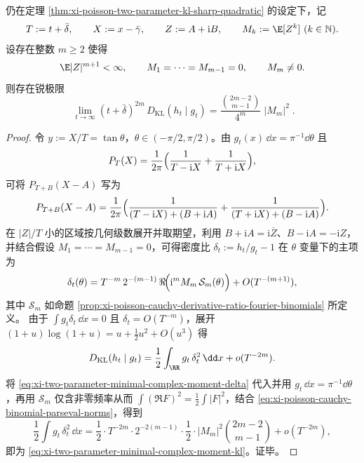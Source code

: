 \begin{theorem}[最小非零复矩支配的高阶相对熵谱指纹]\label{thm:xi-poisson-two-parameter-minimal-complex-moment-kl}
仍在定理 \ref{thm:xi-poisson-two-parameter-kl-sharp-quadratic} 的设定下，记
\[
T:=t+\bar\delta,\qquad X:=x-\bar\gamma,\qquad
Z:=A+\mathrm{i}B,\qquad M_k:=\E[Z^k]\ (k\in\mathbb N).
\]
设存在整数 \(m\ge 2\) 使得
\[
\E|Z|^{m+1}<\infty,
\qquad
M_1=\cdots=M_{m-1}=0,
\qquad
M_m\neq 0.
\]
则存在锐极限
\begin{equation}\label{eq:xi-two-parameter-minimal-complex-moment-kl}
\boxed{\;
\lim_{t\to\infty} (t+\bar\delta)^{2m}\,D_{\mathrm{KL}}(h_t\mid g_t)
=\frac{\binom{2m-2}{m-1}}{4^{m}}\;|M_m|^2\; }.
\end{equation}
\end{theorem}
\begin{proof}
令 \(y:=X/T=\tan\theta\)，\(\theta\in(-\pi/2,\pi/2)\)。由
\(
g_t(x)\,\dd x=\pi^{-1}\dd\theta
\)
且
\[
P_T(X)=\frac{1}{2\pi}\Bigl(\frac{1}{T-\mathrm{i}X}+\frac{1}{T+\mathrm{i}X}\Bigr),
\]
可将
\(
P_{T+B}(X-A)
\)
写为
\[
P_{T+B}(X-A)
=\frac{1}{2\pi}\Bigl(\frac{1}{(T-\mathrm{i}X)+(B+\mathrm{i}A)}+\frac{1}{(T+\mathrm{i}X)+(B-\mathrm{i}A)}\Bigr).
\]
在 \(|Z|/T\) 小的区域按几何级数展开并取期望，利用 \(B+\mathrm{i}A=\mathrm{i}\overline{Z}\)、\(B-\mathrm{i}A=-\mathrm{i}Z\)，并结合假设 \(M_1=\cdots=M_{m-1}=0\)，可得密度比
\(
\delta_t:=h_t/g_t-1
\)
在 \(\theta\) 变量下的主项为
\begin{equation}\label{eq:xi-two-parameter-minimal-complex-moment-delta}
\delta_t(\theta)
=T^{-m}\,2^{-(m-1)}\,
\Re\!\Bigl(\mathrm{i}^{m}M_m\,\mathcal S_m(\theta)\Bigr)
+O(T^{-(m+1)}),
\end{equation}
其中 \(\mathcal S_m\) 如命题 \ref{prop:xi-poisson-cauchy-derivative-ratio-fourier-binomials} 所定义。
由于 \(\int g_t\delta_t\,\dd x=0\) 且 \(\delta_t=O(T^{-m})\)，展开
\(
(1+u)\log(1+u)=u+\frac12u^2+O(u^3)
\)
得
\[
D_{\mathrm{KL}}(h_t\mid g_t)=\frac12\int_{\RR} g_t\,\delta_t^2\,\dd x+o(T^{-2m}).
\]
将 \eqref{eq:xi-two-parameter-minimal-complex-moment-delta} 代入并用
\(
g_t\,\dd x=\pi^{-1}\dd\theta
\)，再用 \(\mathcal S_m\) 仅含非零频率从而
\(
\int (\Re F)^2=\frac12\int |F|^2
\)，结合 \eqref{eq:xi-poisson-cauchy-binomial-parseval-norms}，得到
\[
\frac12\int g_t\,\delta_t^2\,\dd x
=\frac12\cdot T^{-2m}\cdot 2^{-2(m-1)}\cdot \frac12\cdot |M_m|^2\binom{2m-2}{m-1}
+o(T^{-2m}),
\]
即为 \eqref{eq:xi-two-parameter-minimal-complex-moment-kl}。证毕。
\end{proof}


